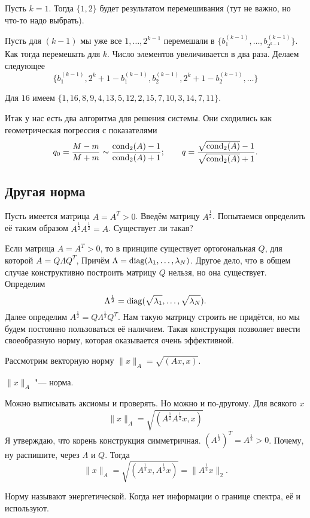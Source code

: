 Пусть $k=1$. Тогда $\{1,2\}$ будет результатом перемешивания (тут не важно, но что-то надо выбрать).

Пусть для $(k-1)$ мы уже все $1,\dots,2^{k-1}$ перемешали в $\{b_1^{(k-1)},\dots, b_{2^{k-1}}^{(k-1)}\}$. Как тогда перемешать для $k$. Число элементов увеличивается в два раза. Делаем следующее
\[
  \{b_1^{(k-1)},2^k+1-b_1^{(k-1)}, b_2^{(k-1)}, 2^k+1 - b_2^{(k-1)},\dots\}
\]

Для $16$ имеем $\{1,16,8,9,4,13,5,12,2,15,7,10,3,14,7,11\}$.

Итак у нас есть два алгоритма для решения системы. Они сходились как геометрическая погрессия с показателями
\[
  q_0 = \frac{M-m}{M+m} \sim \frac{\operatorname{cond}_2(A) - 1}{\operatorname{cond}_2(A) + 1};\qquad
  q = \frac{\sqrt{\operatorname{cond}_2(A)} - 1}{\sqrt{\operatorname{cond}_2(A)} + 1}.
\]

\subsection{Другая норма}
Пусть имеется матрица $A = A^T>0$. Введём матрицу $A^{\frac12}$. Попытаемся определить её таким образом $A^{\frac12}A^{\frac12} = A$. Существует ли такая?

Если матрица $A= A^T>0$, то в принципе существует ортогональная $Q$, для которой $A = Q \Lambda Q^T$, Причём $\Lambda = \operatorname{diag}(\lambda_1,\dots, \lambda_N)$. Другое дело, что в общем случае конструктивно построить матрицу $Q$ нельзя, но она существует. Определим
\[
  \Lambda^{\frac12} = \operatorname{diag}(\sqrt{\lambda_1},\dots,\sqrt{\lambda_N}).
\]
Далее определим $A^{\frac12} = Q\Lambda^{\frac12}Q^T$.
Нам такую матрицу строить не придётся, но мы будем постоянно пользоваться её наличием.
Такая конструкция позволяет ввести своеобразную норму, которая оказывается очень эффективной.

Рассмотрим векторную норму $\|x\|_A = \sqrt{ (Ax,x)}$.
\begin{Ut}
  $\|x\|_A$ "--- норма. 
\end{Ut}
\begin{Proof}
Можно выписывать аксиомы и проверять. Но можно и по-другому. Для всякого $x$
\[
  \|x\|_A = \sqrt{ (A^{\frac12} A^{\frac12} x,x)}
\]
Я утверждаю, что корень конструкция симметричная. $(A^{\frac12})^T = A^{\frac12}>0$. Почему, ну распишите, через $\Lambda$ и $Q$. Тогда
\[
  \|x\|_A = \sqrt{(A^{\frac12} x,A^{\frac12}x)} = \|A^{\frac12}x\|_2.
\]
\end{Proof}

Норму называют энергетической. Когда нет информации о границе спектра, её и используют.
